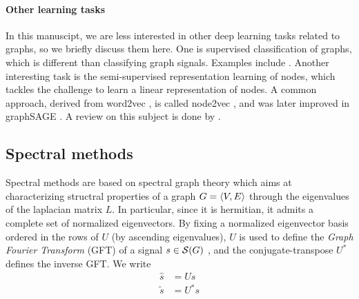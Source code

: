 \paragraph{Other learning tasks}
In this manuscipt, we are less interested in other deep learning tasks related to graphs, so we briefly discuss them here. One is supervised classification of graphs, which is different than classifying graph signals. Examples include \citep{niepert2016learning,tixier2017classifying}. Another interesting task is the semi-supervised representation learning of nodes, which tackles the challenge to learn a linear representation of nodes. A common approach, derived from word2vec \citep{mikolov2013efficient,mikolov2013distributed}, is called node2vec \citep{grover2016node2vec}, and was later improved in graphSAGE \citep{hamilton2017inductive}. A review on this subject is done by \cite{hamilton2017representation}.






\subsection{Spectral methods}
\label{sec:spec}

Spectral methods are based on spectral graph theory \citep{chung1996spectral} which aims at characterizing structral properties of a graph $G = \langle V, E \rangle$ through the eigenvalues of the laplacian matrix $L$. In particular, since it is hermitian, it admits a complete set of normalized eigenvectors. By fixing a normalized eigenvector basis ordered in the rows of $U$ (by ascending eigenvalues), $U$ is used to define the \emph{Graph Fourier Transform} (GFT) of a signal $s \in \mathcal{S}(G)$ \citep{shuman2013emerging}, and the conjugate-transpose $U^*$ defines the inverse GFT. We write
\begin{align}
\widehat{s} &= Us\\
\widetilde{s} &= U^*s
\end{align}

